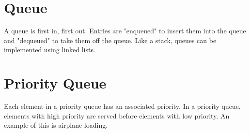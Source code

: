 \section{Queue}
A queue is first in, first out. Entries are "enqueued" to insert 
them into the queue and "dequeued" to take them off the queue. 
Like a stack, queues can be implemented using linked lists. 

\section{Priority Queue}
Each element in a priority queue has an 
associated priority. In a priority queue, 
elements with high priority are served before 
elements with low priority. An example of this 
is airplane loading.